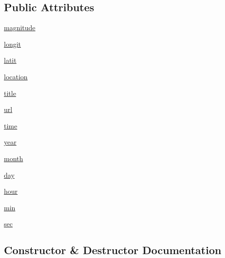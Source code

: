 \subsection*{Public Attributes}
\begin{DoxyCompactItemize}
\item 
\hyperlink{class_earthquake_u_s_g_s_1_1_earthquake_u_s_g_s_a8b014933b4b3373d35e20118e48d435d}{magnitude}
\item 
\hyperlink{class_earthquake_u_s_g_s_1_1_earthquake_u_s_g_s_a4fec1e70f0aedd9d19f728aa5d316098}{longit}
\item 
\hyperlink{class_earthquake_u_s_g_s_1_1_earthquake_u_s_g_s_ae115284d341b74a7e28e34e178216718}{latit}
\item 
\hyperlink{class_earthquake_u_s_g_s_1_1_earthquake_u_s_g_s_aa678a04be109b65cf91134acd16d95b2}{location}
\item 
\hyperlink{class_earthquake_u_s_g_s_1_1_earthquake_u_s_g_s_a5ee446bf29a35b35c4e13e642c3e247a}{title}
\item 
\hyperlink{class_earthquake_u_s_g_s_1_1_earthquake_u_s_g_s_a2636b5997fa6eeb2deb31f739a507eec}{url}
\item 
\hyperlink{class_earthquake_u_s_g_s_1_1_earthquake_u_s_g_s_a6273e67dccfc163a5bd72974371218a0}{time}
\item 
\hyperlink{class_earthquake_u_s_g_s_1_1_earthquake_u_s_g_s_a54d0cd00a8318c8170c39544c69353b5}{year}
\item 
\hyperlink{class_earthquake_u_s_g_s_1_1_earthquake_u_s_g_s_a3b882a16c0a432373a4f40535f913dcf}{month}
\item 
\hyperlink{class_earthquake_u_s_g_s_1_1_earthquake_u_s_g_s_afeac83440d38fc65ed1ea7a4b0e45ede}{day}
\item 
\hyperlink{class_earthquake_u_s_g_s_1_1_earthquake_u_s_g_s_ac3f8a5e9c7c811c433c15e3edff3000a}{hour}
\item 
\hyperlink{class_earthquake_u_s_g_s_1_1_earthquake_u_s_g_s_aecfe32a69e231bcd8e4e329f7d023d0e}{min}
\item 
\hyperlink{class_earthquake_u_s_g_s_1_1_earthquake_u_s_g_s_a7e81059936746568141365f9a9ccdb04}{sec}
\end{DoxyCompactItemize}


\subsection{Constructor \& Destructor Documentation}
\hypertarget{class_earthquake_u_s_g_s_1_1_earthquake_u_s_g_s_afbfb7d79fb8873923f7f808f24f05cf4}{}
